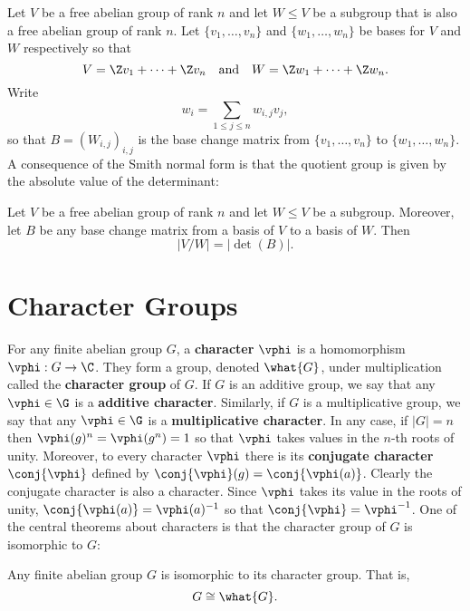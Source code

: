     Let $V$ be a free abelian group of rank $n$ and let $W \le V$ be a subgroup that is also a free abelian group of rank $n$. Let $\{v_{1},\ldots,v_{n}\}$ and $\{w_{1},\ldots,w_{n}\}$ be bases for $V$ and $W$ respectively so that
    \[
      V = \Z v_{1}+\cdots+\Z v_{n} \quad \text{and} \quad W = \Z w_{1}+\cdots+\Z w_{n}.
    \]
    Write
    \[
      w_{i} = \sum_{1 \le j \le n}w_{i,j}v_{j},
    \]
    so that $B = (W_{i,j})_{i,j}$ is the base change matrix from $\{v_{1},\ldots,v_{n}\}$ to $\{w_{1},\ldots,w_{n}\}$. A consequence of the Smith normal form is that the quotient group is given by the absolute value of the determinant:

    \begin{proposition}\label{prop:base_change_quotient_determinant}
      Let $V$ be a free abelian group of rank $n$ and let $W \le V$ be a subgroup. Moreover, let $B$ be any base change matrix from a basis of $V$ to a basis of $W$. Then
      \[
        |V/W| = |\det(B)|.
      \]
    \end{proposition}
  \section{Character Groups}\label{append:Character_Groups}
    For any finite abelian group $G$, a \textbf{character} $\vphi$ is a homomorphism $\vphi:G \to \C$. They form a group, denoted $\what{G}$, under multiplication called the \textbf{character group} of $G$. If $G$ is an additive group, we say that any $\vphi \in \G$ is a \textbf{additive character}. Similarly, if $G$ is a multiplicative group, we say that any $\vphi \in \G$ is a \textbf{multiplicative character}. In any case, if $|G| = n$ then $\vphi(g)^{n} = \vphi(g^{n}) = 1$ so that $\vphi$ takes values in the $n$-th roots of unity. Moreover, to every character $\vphi$ there is its \textbf{conjugate character} $\conj{\vphi}$ defined by $\conj{\vphi}(g) = \conj{\vphi(a)}$. Clearly the conjugate character is also a character. Since $\vphi$ takes its value in the roots of unity, $\conj{\vphi(a)} = \vphi(a)^{-1}$ so that $\conj{\vphi} = \vphi^{-1}$. One of the central theorems about characters is that the character group of $G$ is isomorphic to $G$:

    \begin{proposition}\label{prop:character_group_isomorphim}
      Any finite abelian group $G$ is isomorphic to its character group. That is,
      \[
        G \cong \what{G}.
      \]
    \end{proposition}


